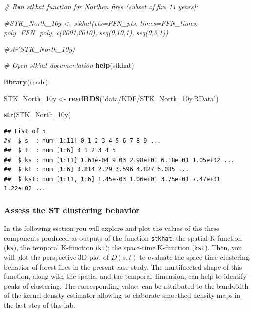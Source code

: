 \documentclass[
]{article}
\newenvironment{Shaded}{\begin{snugshade}}{\end{snugshade}}
\newcommand{\CommentTok}[1]{\textcolor[rgb]{0.56,0.35,0.01}{\textit{#1}}}
\newcommand{\FunctionTok}[1]{\textcolor[rgb]{0.13,0.29,0.53}{\textbf{#1}}}
\newcommand{\NormalTok}[1]{#1}
\newcommand{\OtherTok}[1]{\textcolor[rgb]{0.56,0.35,0.01}{#1}}
\newcommand{\StringTok}[1]{\textcolor[rgb]{0.31,0.60,0.02}{#1}}
\begin{document}
\begin{Shaded}
\begin{Highlighting}[]
\CommentTok{\# Run stkhat function for Northen fires (subset of firs 11 years):}

\CommentTok{\#STK\_North\_10y \textless{}{-} stkhat(pts=FFN\_pts, times=FFN\_times, poly=FFN\_poly, c(2001,2010), seq(0,10,1), seq(0,5,1)) }

\CommentTok{\#str(STK\_North\_10y)}
\end{Highlighting}
\end{Shaded}

\begin{Shaded}
\begin{Highlighting}[]
\CommentTok{\# Open stkhat documentation}
\FunctionTok{help}\NormalTok{(stkhat)}
\end{Highlighting}
\end{Shaded}

\begin{Shaded}
\begin{Highlighting}[]
\FunctionTok{library}\NormalTok{(readr)}

\NormalTok{STK\_North\_10y }\OtherTok{\textless{}{-}} \FunctionTok{readRDS}\NormalTok{(}\StringTok{"data/KDE/STK\_North\_10y.RData"}\NormalTok{)}

\FunctionTok{str}\NormalTok{(STK\_North\_10y)}
\end{Highlighting}
\end{Shaded}

\begin{verbatim}
## List of 5
##  $ s  : num [1:11] 0 1 2 3 4 5 6 7 8 9 ...
##  $ t  : num [1:6] 0 1 2 3 4 5
##  $ ks : num [1:11] 1.61e-04 9.03 2.98e+01 6.18e+01 1.05e+02 ...
##  $ kt : num [1:6] 0.814 2.29 3.596 4.827 6.085 ...
##  $ kst: num [1:11, 1:6] 1.45e-03 1.06e+01 3.75e+01 7.47e+01 1.22e+02 ...
\end{verbatim}

\subsubsection{Assess the ST clustering behavior}\label{assess-the-st-clustering-behavior}

In the following section you will explore and plot the values of the three components produced as outputs of the function \texttt{stkhat}: the spatial K-function (\texttt{ks}), the temporal K-function (\texttt{kt}); the space-time K-function (\texttt{kst}).
Then, you will plot the perspective 3D-plot of \(D(s,t)\) to evaluate the space-time clustering behavior of forest fires in the present case study.
The multifaceted shape of this function, along with the spatial and the temporal dimension, can help to identify peaks of clustering.
The corresponding values can be attributed to the bandwidth of the kernel density estimator allowing to elaborate smoothed density maps in the last step of this lab.
\end{document}
